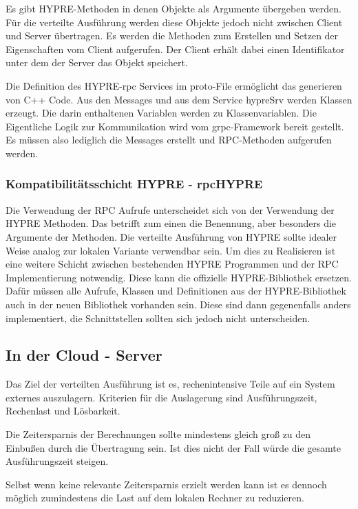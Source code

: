 \documentclass[a4paper,10pt]{article}
\numberwithin{figure}{section}
\numberwithin{table}{section}
\begin{document}
Es gibt HYPRE-Methoden in denen Objekte als Argumente übergeben werden.
Für die verteilte Ausführung werden diese Objekte jedoch nicht zwischen Client und Server übertragen.
Es werden die Methoden zum Erstellen und Setzen der Eigenschaften vom Client aufgerufen.
Der Client erhält dabei einen Identifikator unter dem der Server das Objekt speichert.

Die Definition des HYPRE-rpc Services im proto-File ermöglicht das generieren von C++ Code.
Aus den Messages und aus dem Service hypreSrv werden Klassen erzeugt.
Die darin enthaltenen Variablen werden zu Klassenvariablen.
Die Eigentliche Logik zur Kommunikation wird vom grpc-Framework bereit gestellt.
Es müssen also lediglich die Messages erstellt und RPC-Methoden aufgerufen werden.

\subsubsection{Kompatibilitätsschicht HYPRE - rpcHYPRE}

Die Verwendung der RPC Aufrufe unterscheidet sich von der Verwendung der HYPRE Methoden.
Das betrifft zum einen die Benennung, aber besonders die Argumente der Methoden.
Die verteilte Ausführung von HYPRE sollte idealer Weise analog zur lokalen Variante verwendbar sein.
Um dies zu Realisieren ist eine weitere Schicht zwischen bestehenden HYPRE Programmen und der RPC Implementierung notwendig.
Diese kann die offizielle HYPRE-Bibliothek ersetzen.
Dafür müssen alle Aufrufe, Klassen und Definitionen aus der HYPRE-Bibliothek auch in der neuen Bibliothek vorhanden sein.
Diese sind dann gegenenfalls anders implementiert, die Schnittstellen sollten sich jedoch nicht unterscheiden.

\subsection{In der Cloud - Server}

Das Ziel der verteilten Ausführung ist es, rechenintensive Teile auf ein System externes auszulagern.
Kriterien für die Auslagerung sind Ausführungszeit, Rechenlast und Lösbarkeit.

Die Zeitersparnis der Berechnungen sollte mindestens gleich groß zu den Einbußen durch die Übertragung sein.
Ist dies nicht der Fall würde die gesamte Ausführungszeit steigen.

Selbst wenn keine relevante Zeitersparnis erzielt werden kann ist es dennoch möglich zumindestens die Last auf dem lokalen Rechner zu reduzieren.
\end{document}
